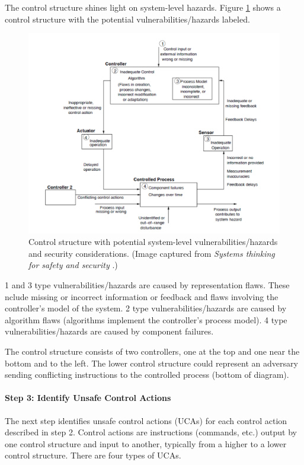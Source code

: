 \documentclass[../../main/main.tex]{subfiles}
\begin{document}
The control structure shines light on system-level hazards.  Figure \ref{stpasecControlStructure} shows a control structure with the potential vulnerabilities/hazards labeled.
\begin{figure}[h]
\includegraphics[width=\linewidth]{../figures/stpasecControlStructure}
\caption{\label{stpasecControlStructure} Control structure with potential system-level vulnerabilities/hazards and security considerations. (Image captured from  \textit{Systems thinking for safety and security} \cite{sys4sec}.)}
\end{figure}

1 and 3 type vulnerabilities/hazards are caused by representation flaws.  These nclude missing or incorrect information or feedback and flaws involving the controller's model of the system.  2 type vulnerabilities/hazards are caused by algorithm flaws (algorithms implement the controller's process model).  4 type vulnerabilities/hazards are caused by component failures.

The control structure consists of two controllers, one at the top and one near the bottom and to the left.  The lower control structure could represent an adversary sending conflicting instructions to the controlled process (bottom of diagram).  

\paragraph*{Step 3: Identify Unsafe Control Actions}
The next step identifies unsafe control actions (UCAs) for each control action described in step 2. Control actions are instructions (commands, etc.) output by one control structure and input to another, typically from a higher to a lower control structure.   There are four types of UCAs.
\end{document}
